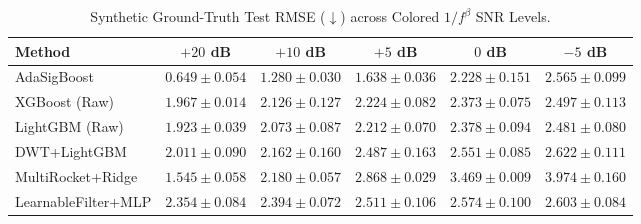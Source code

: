 \begin{table}[t]
\centering
\caption{Synthetic Ground-Truth Test RMSE ($\downarrow$) across Colored $1/f^\beta$ SNR Levels.}
\label{tab:synthetic_snr}
\begin{tabular}{lccccc}
\toprule
Method & $+20$ dB & $+10$ dB & $+5$ dB & $0$ dB & $-5$ dB \\
\midrule
AdaSigBoost & $0.649 \pm 0.054$ & $1.280 \pm 0.030$ & $1.638 \pm 0.036$ & $2.228 \pm 0.151$ & $2.565 \pm 0.099$ \\
XGBoost (Raw) & $1.967 \pm 0.014$ & $2.126 \pm 0.127$ & $2.224 \pm 0.082$ & $2.373 \pm 0.075$ & $2.497 \pm 0.113$ \\
LightGBM (Raw) & $1.923 \pm 0.039$ & $2.073 \pm 0.087$ & $2.212 \pm 0.070$ & $2.378 \pm 0.094$ & $2.481 \pm 0.080$ \\
DWT+LightGBM & $2.011 \pm 0.090$ & $2.162 \pm 0.160$ & $2.487 \pm 0.163$ & $2.551 \pm 0.085$ & $2.622 \pm 0.111$ \\
MultiRocket+Ridge & $1.545 \pm 0.058$ & $2.180 \pm 0.057$ & $2.868 \pm 0.029$ & $3.469 \pm 0.009$ & $3.974 \pm 0.160$ \\
LearnableFilter+MLP & $2.354 \pm 0.084$ & $2.394 \pm 0.072$ & $2.511 \pm 0.106$ & $2.574 \pm 0.100$ & $2.603 \pm 0.084$ \\
\bottomrule
\end{tabular}
\end{table}
